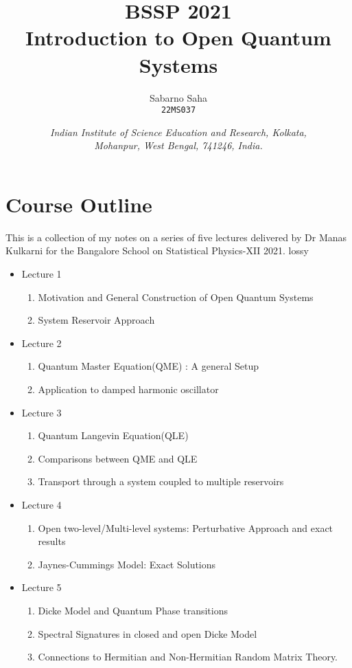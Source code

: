 \documentclass{scrartcl}
\title{
        \Large\textsc{BSSP 2021} \\
        \vspace{10pt}
        \Huge \textbf{Introduction to Open Quantum Systems} \\
}
\author{Sabarno Saha \\ \texttt{22MS037}}
\date{\normalsize
        \textit{Indian Institute of Science Education and Research, Kolkata, \\
        Mohanpur, West Bengal, 741246, India.}
}
\newcommand{\1}{\mathbbm{1}}
\begin{document}
\maketitle
\tableofcontents
\pagebreak{}
\section*{Course Outline}
This is a collection of my notes on a series of five lectures delivered by Dr Manas Kulkarni for the Bangalore School on Statistical Physics-XII 2021. lossy
\begin{itemize}
	\item Lecture 1
	      \begin{enumerate}
		      \item Motivation and General Construction of Open Quantum Systems
		      \item System Reservoir Approach
	      \end{enumerate}
	\item Lecture 2
	      \begin{enumerate}
		      \item Quantum Master Equation(QME) : A general Setup
		      \item Application to damped harmonic oscillator
	      \end{enumerate}
	\item Lecture 3
	      \begin{enumerate}
		      \item Quantum Langevin Equation(QLE)
		      \item Comparisons between QME and QLE
		      \item Transport through a system coupled to multiple reservoirs
	      \end{enumerate}
	\item Lecture 4
	      \begin{enumerate}
		      \item Open two-level/Multi-level systems: Perturbative Approach and exact results
		      \item Jaynes-Cummings Model: Exact Solutions
	      \end{enumerate}
	\item Lecture 5
	      \begin{enumerate}
		      \item Dicke Model and Quantum Phase transitions
		      \item Spectral Signatures in closed and open Dicke Model
		      \item Connections to Hermitian and Non-Hermitian Random Matrix Theory.
	      \end{enumerate}
\end{itemize}
\end{document}
